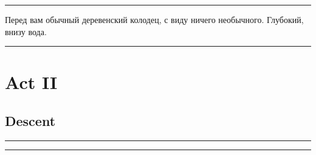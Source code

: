 \documentclass[a5paper,11pt]{book}
\newenvironment{boxed}
{\em\noindent\rule[1ex]{\linewidth}{0.1pt}\linebreak\indent}
{\par\noindent\rule[1ex]{\linewidth}{0.1pt}}
\begin{document}
\begin{multicols}{2}
\begin{boxed}
  Перед вам обычный деревенский колодец, с виду ничего необычного. Глубокий, внизу вода.
\end{boxed}

\section{Act II}

\subsection{Descent}

\begin{boxed}

\end{boxed}








\end{multicols}
\end{document}
